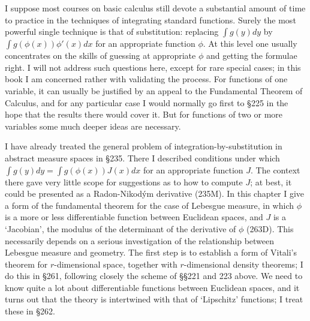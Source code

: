 
\def\diam{\mathop{\text{diam}}}
\def\dist{\mathop{\text{dist}}}

\def\chaptername{Change of Variable in the Integral}
\def\chaptername{Change of variable in the integral}

I suppose most courses on basic calculus still devote a
substantial amount of time to practice in the techniques of integrating
standard functions.   Surely the most powerful single technique is that
of substitution:  replacing $\int g(y)dy$ by $\int g(\phi(x))\phi'(x)dx$
for an appropriate function $\phi$.   At this level one usually
concentrates on the skills of guessing at appropriate $\phi$ and getting
the formulae right.   I will not address such questions here, except for
rare special cases;  in this book I am concerned rather with validating
the process.   For functions of one variable, it can usually be
justified by an appeal to the Fundamental Theorem of Calculus, 
and for any particular case I would normally
go first to \S225 in the hope that the results there would
cover it.   But for functions of two or
more variables some much deeper ideas are necessary.

I have already treated the general problem of
integration-by-substitution in abstract measure spaces in \S235.
There I described conditions under which $\int g(y)dy=\int
g(\phi(x))J(x)dx$ for an appropriate function $J$.   The context there
gave very little scope for suggestions as to how to compute $J$;  at
best, it could be presented as a Radon-Nikod\'ym derivative (235M).   In
this chapter I give a form of the fundamental theorem for the case of
Lebesgue measure, in which $\phi$ is a more or less differentiable
function between Euclidean spaces, and $J$ is a `Jacobian', the
modulus of the determinant of the derivative of $\phi$ (263D).   This
necessarily depends on a serious investigation of the relationship
between Lebesgue measure and geometry.
The first step is to establish a form of Vitali's theorem for
$r$-dimensional space, together with $r$-dimensional density theorems;
I do this in \S261, following closely the scheme of \S\S221 and 223
above.   We need to know quite a lot about differentiable functions
between Euclidean spaces, and it turns out that the theory is
intertwined with that of `Lipschitz' functions;  I treat these in
\S262.

